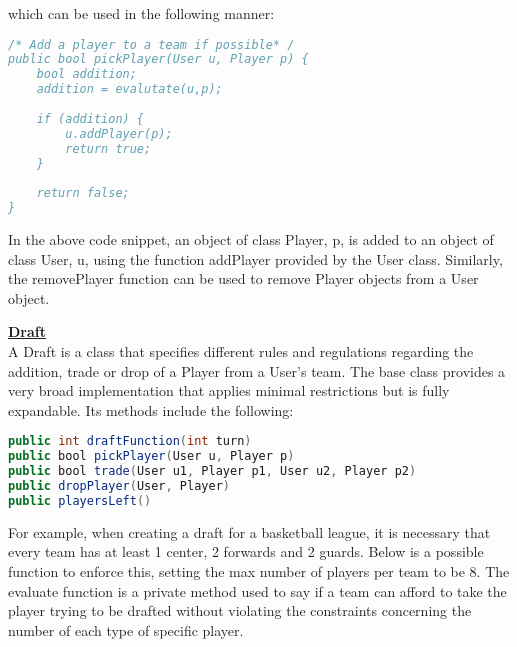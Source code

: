 \documentclass[12pt]{report}
\begin{document}
\begin{doublespace}
which can be used in the following manner:
\end{doublespace}

\begin{lstlisting}[language=Java,label=some-code,caption=Action]
/* Add a player to a team if possible* /
public bool pickPlayer(User u, Player p) {
	bool addition;
	addition = evalutate(u,p);
	
	if (addition) {
		u.addPlayer(p);
		return true;
	}
	
	return false;
}
\end{lstlisting}

\begin{doublespace}
In the above code snippet, an object of class Player, p, is added to an object of class User, u, using the function addPlayer provided by the User class. Similarly, the removePlayer function can be used to remove Player objects from a User object.

\textbf{\underline{Draft}}
\\
A Draft is a class that specifies different rules and regulations regarding the addition, trade or drop of a Player from a User's team. The base class provides a very broad implementation that applies minimal restrictions but is fully expandable. Its methods include the following:
\end{doublespace}

\begin{lstlisting}[language=Java,label=some-code,caption=Action]
public int draftFunction(int turn)
public bool pickPlayer(User u, Player p)
public bool trade(User u1, Player p1, User u2, Player p2)
public dropPlayer(User, Player)
public playersLeft()
\end{lstlisting}

\begin{doublespace}
For example, when creating a draft for a basketball league, it is necessary that every team has at least 1 center, 2 forwards and 2 guards. Below is a possible function to enforce this, setting the max number of players per team to be 8. The evaluate function is a private method used to say if a team can afford to take the player trying to be drafted without violating the constraints concerning the number of each type of specific player.
\end{doublespace}
\end{document}

